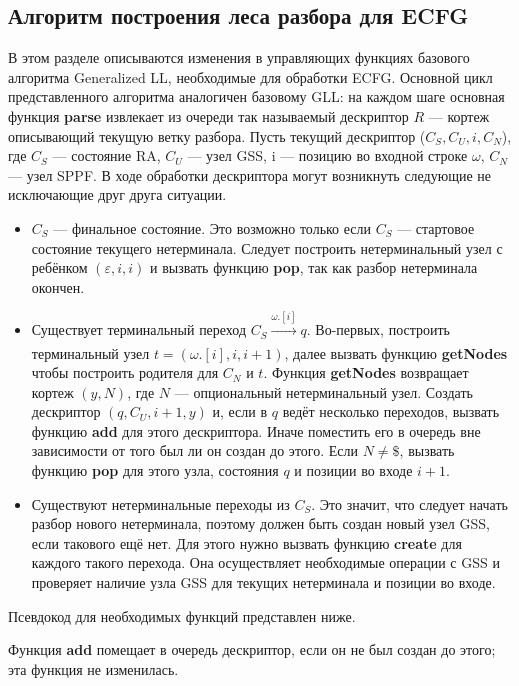 \subsection{Алгоритм построения леса разбора для ECFG}
В этом разделе описываются изменения в управляющих функциях базового алгоритма 
Generalized LL, необходимые для обработки ECFG. Основной цикл 
представленного алгоритма аналогичен базовому
GLL: на каждом шаге основная функция \textbf{parse} извлекает из очереди так называемый дескриптор
$R$ --- кортеж описывающий текущую ветку разбора. Пусть текущий дескриптор ($C_S, C_U, i, C_N$),
где $C_S$ --- состояние RA, $C_U$ --- узел GSS, i --- позицию во входной строке 
$\omega$, $C_N$ --- узел SPPF. В ходе обработки дескриптора могут возникнуть следующие
не исключающие друг друга ситуации.
\begin{itemize} 
	\item $C_S$ --- финальное состояние. Это возможно только если $C_S$
	--- стартовое состояние текущего нетерминала. Следует построить нетерминальный
	узел с ребёнком $(\varepsilon, i, i)$ и вызвать функцию \textbf{pop}, так как
	разбор нетерминала окончен.
	
	\item Существует терминальный переход $C_S \xrightarrow[]{\omega.[i]} q$.
	Во-первых, построить терминальный узел $ t = (\omega.[i], i, i+1) $, далее 
	вызвать функцию \textbf{getNodes} чтобы построить родителя для $ C_N $ и $ t $. 
	Функция \textbf{getNodes} возвращает кортеж $ (y, N) $, где $N$ --- опциональный
	нетерминальный узел. Создать дескриптор $ (q, C_U, i+1, y) $ и, если
	в $q$ ведёт несколько переходов, вызвать функцию \textbf{add} для этого дескриптора.
	Иначе поместить его в очередь вне зависимости от того был ли он создан до этого. 
	Если $ N \neq \$$,
	вызвать функцию \textbf{pop} для этого узла, состояния $ q $ и позиции во
	входе $ i + 1 $.
	
	\item Существуют нетерминальные переходы из $C_S$.
	Это значит, что следует начать разбор нового нетерминала, поэтому должен быть
	создан новый узел GSS, если такового ещё нет. Для этого нужно вызвать функцию
	\textbf{create} для каждого такого перехода. Она осуществляет необходимые
	операции с GSS и проверяет наличие узла GSS для текущих нетерминала и 
	позиции во входе.
\end{itemize}
Псевдокод для необходимых функций представлен ниже.

Функция \textbf{add} помещает в очередь дескриптор, если он не был создан до этого; эта функция не изменилась.


